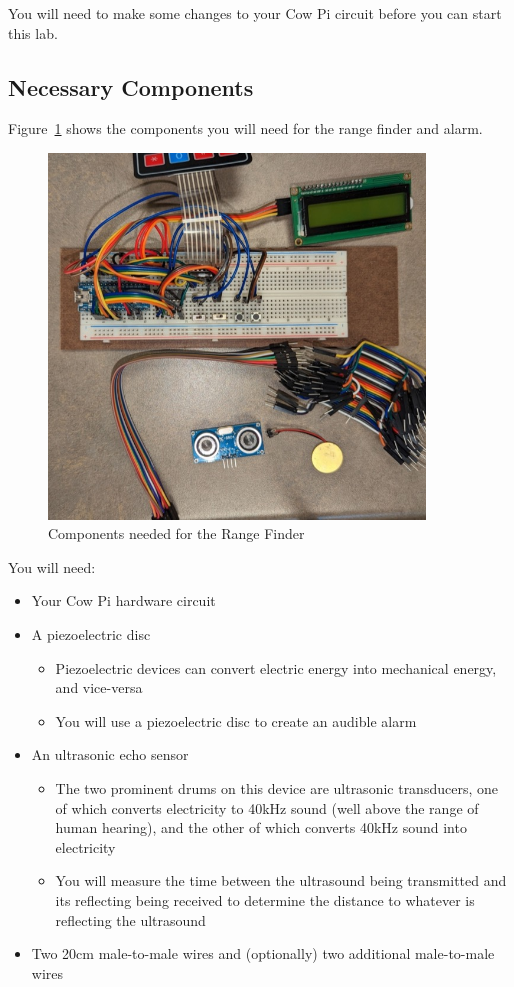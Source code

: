 You will need to make some changes to your Cow Pi circuit before you can start this lab.

\subsection{Necessary Components}

Figure~\ref{fig:components} shows the components you will need for the range finder and alarm.

\begin{figure}
    \centering
    \includegraphics[width=10cm]{reconfiguration_images/components}
    \caption{Components needed for the Range Finder \label{fig:components}}
\end{figure}

You will need:
\begin{itemize}
    \item Your Cow Pi hardware circuit
    \item A piezoelectric disc
        \begin{itemize}
            \item Piezoelectric devices can convert electric energy into mechanical energy, and vice-versa
            \item You will use a piezoelectric disc to create an audible alarm
        \end{itemize}
    \item An ultrasonic echo sensor
        \begin{itemize}
            \item The two prominent drums on this device are ultrasonic transducers, one of which converts electricity to 40kHz sound (well above the range of human hearing), and the other of which converts 40kHz sound into electricity
            \item You will measure the time between the ultrasound being transmitted and its reflecting being received to determine the distance to whatever is reflecting the ultrasound
        \end{itemize}
    \item Two 20cm male-to-male wires and (optionally) two additional male-to-male wires
\end{itemize}

